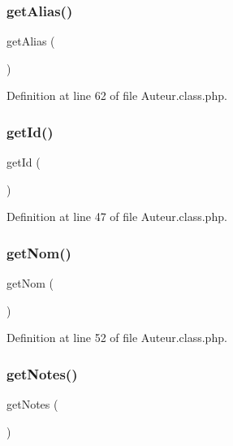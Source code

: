 \subsubsection{\texorpdfstring{get\+Alias()}{getAlias()}}
{\footnotesize\ttfamily get\+Alias (\begin{DoxyParamCaption}{ }\end{DoxyParamCaption})}



Definition at line 62 of file Auteur.\+class.\+php.

\mbox{\label{class_auteur_a12251d0c022e9e21c137a105ff683f13}} 
\subsubsection{\texorpdfstring{get\+Id()}{getId()}}
{\footnotesize\ttfamily get\+Id (\begin{DoxyParamCaption}{ }\end{DoxyParamCaption})}



Definition at line 47 of file Auteur.\+class.\+php.

\mbox{\label{class_auteur_a184f2299ee4553fa0782ea87c9aed362}} 
\subsubsection{\texorpdfstring{get\+Nom()}{getNom()}}
{\footnotesize\ttfamily get\+Nom (\begin{DoxyParamCaption}{ }\end{DoxyParamCaption})}



Definition at line 52 of file Auteur.\+class.\+php.

\mbox{\label{class_auteur_ae5d103a1f6ef01da2567380016c726c8}} 
\subsubsection{\texorpdfstring{get\+Notes()}{getNotes()}}
{\footnotesize\ttfamily get\+Notes (\begin{DoxyParamCaption}{ }\end{DoxyParamCaption})}



